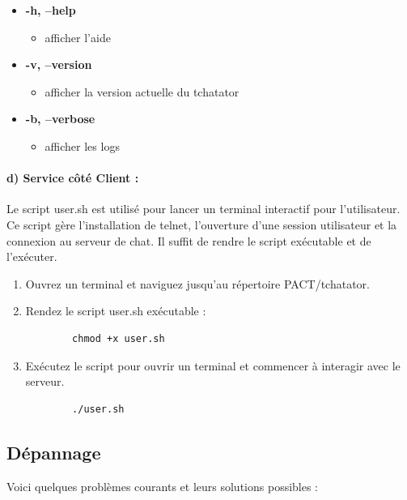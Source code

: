 \documentclass{report}
\begin{document}
\begin{itemize}[label={}]
	\item \textbf{-h, --help}
	\begin{itemize}
		\item afficher l’aide
	\end{itemize}
	\item \textbf{-v, --version}
	\begin{itemize}
		\item afficher la version actuelle du tchatator
	\end{itemize}
	\item \textbf{-b, --verbose}
	\begin{itemize}
		\item afficher les logs
	\end{itemize}
\end{itemize}

\paragraph{d) Service côté Client :}

Le script user.sh est utilisé pour lancer un terminal interactif pour l'utilisateur. Ce script gère l'installation de telnet, l'ouverture d'une session utilisateur et la connexion au serveur de chat. Il suffit de rendre le script exécutable et de l'exécuter.

\begin{enumerate}
	\item Ouvrez un terminal et naviguez jusqu'au répertoire PACT/tchatator.
	
	\item Rendez le script user.sh exécutable :
	\begin{verbatim}
		chmod +x user.sh
	\end{verbatim}
	
	\item Exécutez le script pour ouvrir un terminal et commencer à interagir avec le serveur.
	
	\begin{verbatim}
		./user.sh
	\end{verbatim}
\end{enumerate}

\subsection{Dépannage}

Voici quelques problèmes courants et leurs solutions possibles :
\end{document}
